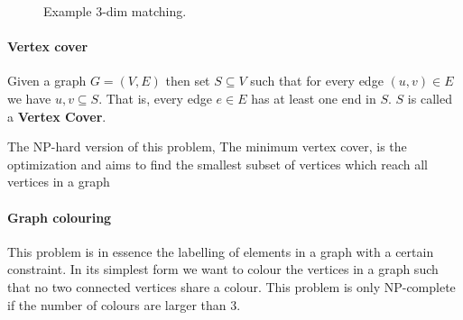 \documentclass[12pt]{article} %
\begin{document}
\begin{figure}[H]
\caption{Example 3-dim matching.}
\label{3dim}
\end{figure} 

\paragraph{Vertex cover}
Given a graph $G = (V, E)$ then set $S \subseteq V$ such that for every edge $(u, v) \in E$ we have ${u, v} \subseteq S$. That is, every edge $e \in E$ has at least one end in $S$. $S$ is called a \textbf{Vertex Cover}.

\par The NP-hard version of this problem, The minimum vertex cover, is the optimization and aims to find the smallest subset of vertices which reach all vertices in a graph 

\paragraph{Graph colouring}
This problem is in essence the labelling of elements in a graph with a certain constraint. In its simplest form we want to colour the vertices in a graph such that no two connected vertices share a colour. This problem is only NP-complete if the number of colours are larger than 3.
\end{document}
